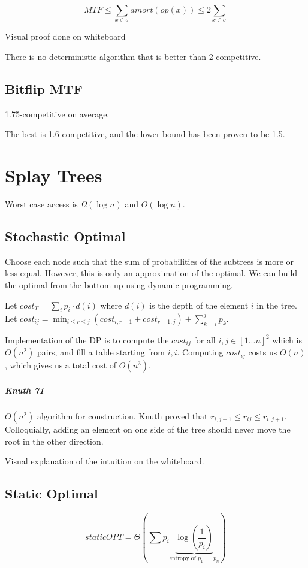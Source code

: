 \documentclass[a4paper]{article}
\begin{document}
\[MTF \le \sum_{x\in \sigma}amort(op(x))\le 2\sum_{x\in \sigma}\]

Visual proof done on whiteboard

There is no deterministic algorithm that is better than 2-competitive.

\subsection{Bitflip MTF}
1.75-competitive on average.

The best is 1.6-competitive, and the lower bound has been proven to be 1.5.

\section{Splay Trees}

Worst case access is $\Omega(\log n)$ and $O(\log n)$.

\subsection{Stochastic Optimal}
Choose each node such that the sum of probabilities of the subtrees is more or less equal. However, this is only an approximation of the optimal. We can build the optimal from the bottom up using dynamic programming.

Let $cost_T=\sum_i p_i \cdot d(i)$ where $d(i)$ is the depth of the element $i$ in the tree.
Let $cost_{ij}=\min_{i\le r \le j}\left( cost_{i,r-1} + cost_{r+1, j} \right) + \sum_{k=i}^j p_k$.

Implementation of the DP is to compute the $cost_{ij}$ for all $i,j \in [1...n]^2$ which is $O(n^2)$ pairs, and fill a table starting from $i,i$. Computing $cost_{ij}$ costs us $O(n)$, which gives us a total cost of $O(n^3)$.

\subparagraph{Knuth 71}
$O(n^2)$ algorithm for construction. Knuth proved that $r_{i,j-1} \le r_{ij} \le r_{i,j+1}$. Colloquially, adding an element on one side of the tree should never move the root in the other direction.

Visual explanation of the intuition on the whiteboard.

\subsection{Static Optimal}

\[staticOPT= \Theta\left( \sum p_i \underbrace{\log\left(\frac{1}{p_i}\right)}_{\text{entropy of $p_1,...,p_n$}} \right)\]
\end{document}
